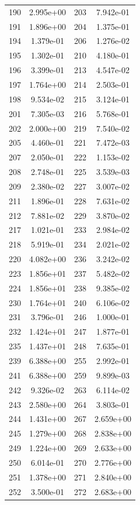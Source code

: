 \documentclass[12pt]{article}
\begin{document}
\begin{longtable}{@{}cccc@{}}
190 & 2.995e+00 & 203 & 7.942e-01 \\
191 & 1.896e+00 & 204 & 1.375e-01 \\
194 & 1.379e-01 & 206 & 1.276e-02 \\
195 & 1.302e-01 & 210 & 4.180e-01 \\
196 & 3.399e-01 & 213 & 4.547e-02 \\
197 & 1.764e+00 & 214 & 2.503e-01 \\
198 & 9.534e-02 & 215 & 3.124e-01 \\
201 & 7.305e-03 & 216 & 5.768e-01 \\
202 & 2.000e+00 & 219 & 7.540e-02 \\
205 & 4.460e-01 & 221 & 7.472e-03 \\
207 & 2.050e-01 & 222 & 1.153e-02 \\
208 & 2.748e-01 & 225 & 3.539e-03 \\
209 & 2.380e-02 & 227 & 3.007e-02 \\
211 & 1.896e-01 & 228 & 7.631e-02 \\
212 & 7.881e-02 & 229 & 3.870e-02 \\
217 & 1.021e-01 & 233 & 2.984e-02 \\
218 & 5.919e-01 & 234 & 2.021e-02 \\
220 & 4.082e+00 & 236 & 3.242e-02 \\
223 & 1.856e+01 & 237 & 5.482e-02 \\
224 & 1.856e+01 & 238 & 9.385e-02 \\
230 & 1.764e+01 & 240 & 6.106e-02 \\
231 & 3.796e-01 & 246 & 1.000e-01 \\
232 & 1.424e+01 & 247 & 1.877e-01 \\
235 & 1.437e+01 & 248 & 7.635e-01 \\
239 & 6.388e+00 & 255 & 2.992e-01 \\
241 & 6.388e+00 & 259 & 9.899e-03 \\
242 & 9.326e-02 & 263 & 6.114e-02 \\
243 & 2.580e+00 & 264 & 3.803e-01 \\
244 & 1.431e+00 & 267 & 2.659e+00 \\
245 & 1.279e+00 & 268 & 2.838e+00 \\
249 & 1.224e+00 & 269 & 2.633e+00 \\
250 & 6.014e-01 & 270 & 2.776e+00 \\
251 & 1.378e+00 & 271 & 2.840e+00 \\
252 & 3.500e-01 & 272 & 2.683e+00 \\

\end{longtable}
\end{document}
